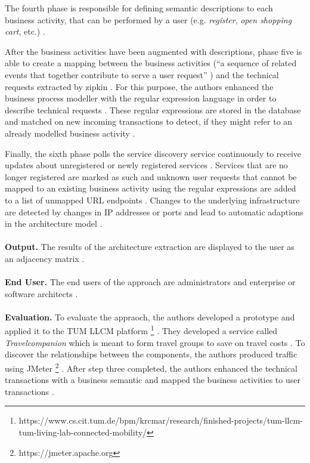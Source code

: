 The fourth phase is responsible for defining semantic descriptions to each business activity, that can be performed by a user (e.g. \textit{register}, \textit{open shopping cart}, etc.) \cite{Kleehaus2018}.

After the business activities have been augmented with descriptions, phase five is able to create a mapping between the business activities (``a sequence of related events that together contribute to serve a user request'' \cite{Kleehaus2018}) and the technical requests extracted by zipkin \cite{Kleehaus2018}.
For this purpose, the authors enhanced the business process modeller with the regular expression language in order to describe technical requests \cite{Kleehaus2018}.
These regular expressions are stored in the database and matched on new incoming transactions to detect, if they might refer to an already modelled business activity \cite{Kleehaus2018}.

Finally, the sixth phase polls the service discovery service continuously to receive updates about unregistered or newly registered services \cite{Kleehaus2018}.
Services that are no longer registered are marked as such and unknown user requests that cannot be mapped to an existing business activity using the regular expressions are added to a list of unmapped URL endpoints \cite{Kleehaus2018}.
Changes to the underlying infrastructure are detected by changes in IP addresses or ports and lead to automatic adaptions in the architecture model \cite{Kleehaus2018}.
\\ \\
\textbf{Output.}
The results of the architecture extraction are displayed to the user as an adjacency matrix \cite{Kleehaus2018}.
\\ \\
\textbf{End User.}
The end users of the approach are administrators and enterprise or software architects \cite{Kleehaus2018}.
\\ \\
\textbf{Evaluation.}
To evaluate the appraoch, the authors developed a prototype and applied it to the TUM LLCM platform \footnote{https://www.cs.cit.tum.de/bpm/krcmar/research/finished-projects/tum-llcm-tum-living-lab-connected-mobility/} \cite{Kleehaus2018}.
They developed a service called \textit{Travelcompanion} which is meant to form travel groups to save on travel costs \cite{Kleehaus2018}.
To discover the relationships between the components, the authors produced traffic using JMeter \footnote{https://jmeter.apache.org} \cite{Kleehaus2018}.
After step three completed, the authors enhanced the technical transactions with a business semantic and mapped the business activities to user transactions \cite{Kleehaus2018}.

